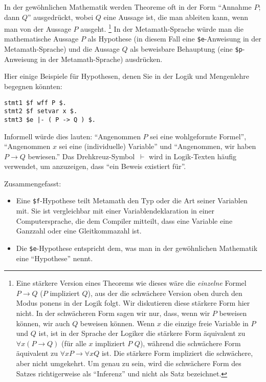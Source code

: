 In der gewöhnlichen Mathematik werden Theoreme oft in der Form "`Annahme $P$; dann $Q$"' ausgedrückt, wobei $Q$ eine Aussage ist, die man ableiten kann, wenn man von der Aussage $P$ ausgeht.
\footnote{Eine stärkere Version eines Theorems wie dieses wäre die {\em einzelne} Formel $P\rightarrow Q$ ($P$ impliziert $Q$), aus der die schwächere Version oben durch den Modus ponens in der Logik folgt.  
Wir diskutieren diese stärkere Form hier nicht.  In der schwächeren Form sagen wir nur, dass, wenn wir $P$ beweisen können, wir auch $Q$ beweisen können.  
Wenn $x$ die einzige freie Variable in $P$ und $Q$ ist, ist in der Sprache der Logiker die stärkere Form äquivalent zu $\forall x ( P \rightarrow Q)$ (für alle $x$ impliziert $P$ $Q$), während die schwächere Form äquivalent zu $\forall x P \rightarrow \forall x Q$ ist. Die stärkere Form impliziert die schwächere, aber nicht umgekehrt.  
Um genau zu sein, wird die schwächere Form des Satzes richtigerweise als "`Inferenz"' und nicht als Satz bezeichnet.}
In der Metamath-Sprache würde man die mathematische Aussage $P$ als Hypothese (in diesem Fall eine \texttt{\$e}-Anweisung in der Metamath-Sprache) und die Aussage $Q$ als beweisbare Behauptung (eine \texttt{\$p}-Anweisung in der Metamath-Sprache) ausdrücken.

Hier einige Beispiele für Hypothesen, denen Sie in der Logik und Mengenlehre begegnen könnten:
\begin{center}
	\texttt{stmt1 \$f wff P \$.}\\
	\texttt{stmt2 \$f setvar x \$.}\\
	\texttt{stmt3 \$e |- ( P -> Q ) \$.}
\end{center}

Informell würde dies lauten: "`Angenommen $P$ sei eine wohlgeformte Formel"', "`Angenommen $x$ sei eine (individuelle) Variable"' und "`Angenommen, wir haben $P \rightarrow Q$ bewiesen."'  Das Drehkreuz-Symbol \,$\vdash$ wird in Logik-Texten häufig verwendet, um anzuzeigen, dass "`ein Beweis existiert für"'.

Zusammengefasst:
\begin{itemize}
\item Eine \texttt{\$f}-Hypothese teilt Metamath den Typ oder die Art seiner Variablen mit. Sie ist vergleichbar mit einer Variablendeklaration in einer Computersprache, die dem Compiler mitteilt, dass eine Variable eine Ganzzahl oder eine Gleitkommazahl ist.
\item Die \texttt{\$e}-Hypothese entspricht dem, was man in der gewöhnlichen Mathematik eine "`Hypothese"' nennt.
\end{itemize}

